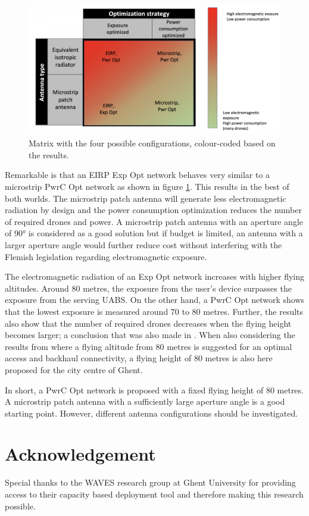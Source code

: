 \documentclass[twocolumn]{phdsymp} %
\begin{document}
\begin{figure}[h!]
  \includegraphics[width=\linewidth]{fourCasesMatrixSol.png}
  \caption{Matrix with the four possible configurations, colour-coded based on the results.}
  \label{fig:resultIllustration}
\end{figure}

Remarkable is that an \gls{EIRP} \gls{Exp Opt} network behaves very similar to a microstrip \gls{PwrC Opt} network as shown 
in figure \ref{fig:resultIllustration}.
This results in the best of both worlds. 
The microstrip patch antenna will generate less electromagnetic radiation by design and
 the power consumption optimization reduces the number of required drones and power. A microstrip patch antenna with an aperture 
 angle of \ang{90} is considered as a good solution but if budget is limited, an antenna with a larger aperture angle 
 would further reduce cost without interfering with the Flemish legislation regarding electromagnetic exposure.

The electromagnetic radiation of an \gls{Exp Opt} network increases with higher flying altitudes.
Around 80 metres, the exposure from the  user's device surpasses the exposure from the serving \gls{UABS}.
On the other hand, a \gls{PwrC Opt} network shows that the lowest exposure is measured around 70 to 80 metres.
Further, the results also show that the number of required drones decreases when the flying height becomes larger; a conclusion that was also made in \cite{J2}.
When also considering the results from \cite{U1} where a flying altitude from 
80 metres is suggested for an optimal access and backhaul connectivity, a flying height 
of 80 metres is also here proposed for the city centre of Ghent.

In short, a \gls{PwrC Opt} network is proposed with a fixed flying height of 80 metres. A microstrip patch 
antenna with a sufficiently large aperture angle is a good starting point. However, different antenna configurations should 
be investigated.

\section*{Acknowledgement}
Special thanks to the WAVES research group at Ghent University for providing 
access to their capacity based deployment tool and therefore making this research possible.



\end{document}
